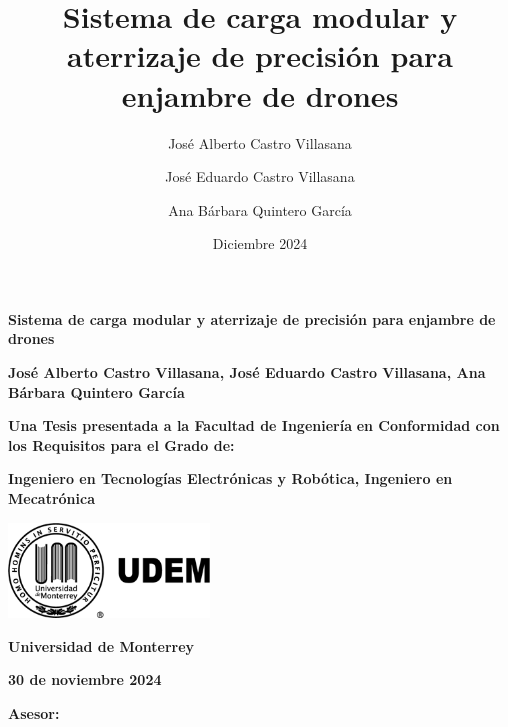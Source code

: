 \documentclass[11pt]{report} %
\title{Sistema de carga modular y aterrizaje de precisión para enjambre de drones} %
\author{José Alberto Castro Villasana \and José Eduardo Castro Villasana \and Ana Bárbara Quintero García} %
\date{Diciembre 2024} %
\begin{document}
\begin{titlepage}
    \centering
    \vspace*{1cm}
    
    {\Huge\textbf{Sistema de carga modular y aterrizaje de precisión para enjambre de drones}} %
    
    \vspace{2.5cm} %
    {\Large\textbf{José Alberto Castro Villasana, José Eduardo Castro Villasana, Ana Bárbara Quintero García}} %
    
    \vfill
    
    {\large\textbf{Una Tesis presentada a la Facultad de Ingeniería}} %
    {\large\textbf{en Conformidad con los Requisitos para el Grado de:}} %
    
    \vspace{0.2cm}
    {\large\textbf{Ingeniero en Tecnologías Electrónicas y Robótica, Ingeniero en Mecatrónica}} %
    
    \vspace{2cm}
    
    \includegraphics[width=0.4\textwidth]{pictures/logo_udem.png} %
    
    \vspace{2cm}
    
    {\large\textbf{Universidad de Monterrey}}

    \vspace{0.2cm}
    {\large{}}

    \vspace{0.2cm}
    {\large{}} %
    
    \vspace{1.5cm}
    {\large\textbf{30 de noviembre 2024}} %
    
    \vfill
    {\large\textbf{Asesor:} } %
    
\end{titlepage}
\end{document}
